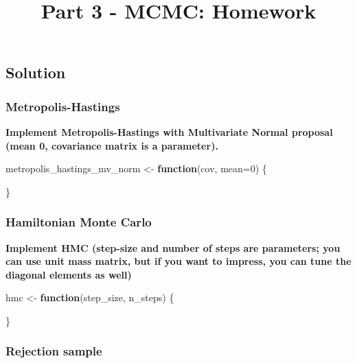 \documentclass[
]{article}
\title{Part 3 - MCMC: Homework}
\author{}
\date{\vspace{-2.5em}}
\newenvironment{Shaded}{\begin{snugshade}}{\end{snugshade}}
\newcommand{\AttributeTok}[1]{\textcolor[rgb]{0.77,0.63,0.00}{#1}}
\newcommand{\ControlFlowTok}[1]{\textcolor[rgb]{0.13,0.29,0.53}{\textbf{#1}}}
\newcommand{\DecValTok}[1]{\textcolor[rgb]{0.00,0.00,0.81}{#1}}
\newcommand{\NormalTok}[1]{#1}
\newcommand{\OtherTok}[1]{\textcolor[rgb]{0.56,0.35,0.01}{#1}}
\begin{document}
\maketitle

\hypertarget{solution}{%
\subsection{Solution}\label{solution}}

\hypertarget{metropolis-hastings}{%
\subsubsection{Metropolis-Hastings}\label{metropolis-hastings}}

\textbf{Implement Metropolis-Hastings with Multivariate Normal proposal
(mean 0, covariance matrix is a parameter).}

\begin{Shaded}
\begin{Highlighting}[]
\NormalTok{metropolis\_hastings\_mv\_norm }\OtherTok{\textless{}{-}} \ControlFlowTok{function}\NormalTok{(cov, }\AttributeTok{mean=}\DecValTok{0}\NormalTok{) \{}
  
\NormalTok{\}}
\end{Highlighting}
\end{Shaded}

\hypertarget{hamiltonian-monte-carlo}{%
\subsubsection{Hamiltonian Monte Carlo}\label{hamiltonian-monte-carlo}}

\textbf{Implement HMC (step-size and number of steps are parameters; you
can use unit mass matrix, but if you want to impress, you can tune the
diagonal elements as well)}

\begin{Shaded}
\begin{Highlighting}[]
\NormalTok{hmc }\OtherTok{\textless{}{-}} \ControlFlowTok{function}\NormalTok{(step\_size, n\_steps) \{}
  
\NormalTok{\}}
\end{Highlighting}
\end{Shaded}

\hypertarget{rejection-sample}{%
\subsubsection{Rejection sample}\label{rejection-sample}}
\end{document}
